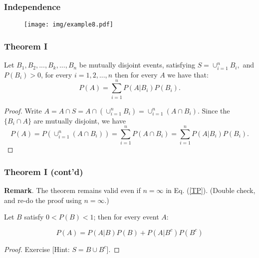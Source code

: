 \documentclass[notes=show,handout]{beamer}\usepackage[]{graphicx}\usepackage[]{color}
\begin{document}
\begin{frame}
\frametitle{Independence}

\begin{example}[cont'd]
\begin{figure}[h!]
\centering
\texttt{[image: img/example8.pdf]}
\end{figure}

\end{example}




\end{frame}


\begin{frame}
\frametitle{Theorem I}

\begin{theorem} 
\label{Th:totprob}
Let  $B_1,B_2,...,B_k,...,B_n$ be mutually disjoint events, satisfying
$S=\cup_{i=1}^{n} B_i,$ and $P(B_i)>0$, for every $i=1,2,...,n$ then for every $A$ we have that:
\begin{equation}
\label{TP}
P(A)=\sum_{i=1}^n P(A\vert B_i) P(B_i).
\end{equation}
\end{theorem}

\begin{footnotesize}
\begin{proof}
Write $A=A\cap S = A\cap (\cup_{i=1}^{n} B_i) = \cup_{i=1}^{n} (A\cap B_i)$. Since the $\{B_i \cap A \}$ are mutually disjoint, we have
\begin{equation*}
P(A)=P\left(  \cup_{i=1}^{n} (A\cap B_i)  \right)=\sum_{i=1}^n P\left( A\cap B_i  \right ) =\sum_{i=1}^n P(A\vert B_i) P(B_i).
\end{equation*}
\end{proof}
\end{footnotesize}

\end{frame}


\begin{frame}
\frametitle{Theorem I (cont'd)}

\textbf{Remark}. The theorem remains valid even if $n=\infty$ in Eq. (\ref{TP}). (Double check, and re-do the proof using $n=\infty$.)


\begin{corollary}
Let $B$ satisfy $0<P(B)<1$; then for every event $A$:

\begin{equation*}
P(A)=P(A\vert B)P(B)+P(A\vert B^c) P(B^c)
\end{equation*}

\end{corollary}

\begin{proof}
Exercise [Hint: $S=B \cup B^c$].
\end{proof}



\end{frame}
\end{document}
